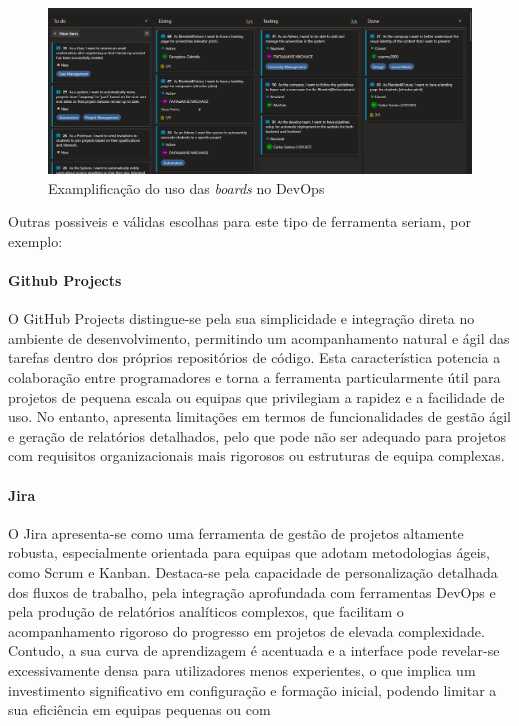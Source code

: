 \begin{figure}
    \includegraphics[width=\linewidth]{capitulos/cap1-introducao/imagens/ferramentas/devops-board.png}
    \caption{Examplificação do uso das \textit{boards} no DevOps}
    \label{fig:devops-boards}
\end{figure}

Outras possiveis e válidas escolhas para este tipo de ferramenta seriam, por exemplo:

\paragraph{Github Projects}

O GitHub Projects distingue-se pela sua simplicidade e integração direta no ambiente de desenvolvimento, permitindo um acompanhamento natural e ágil das tarefas dentro dos próprios repositórios de código. Esta característica potencia a colaboração entre programadores e torna a ferramenta particularmente útil para projetos de pequena escala ou equipas que privilegiam a rapidez e a facilidade de uso. No entanto, apresenta limitações em termos de funcionalidades de gestão ágil e geração de relatórios detalhados, pelo que pode não ser adequado para projetos com requisitos organizacionais mais rigorosos ou estruturas de equipa complexas.

\paragraph{Jira}

O Jira apresenta-se como uma ferramenta de gestão de projetos altamente robusta, especialmente orientada para equipas que adotam metodologias ágeis, como Scrum e Kanban. Destaca-se pela capacidade de personalização detalhada dos fluxos de trabalho, pela integração aprofundada com ferramentas DevOps e pela produção de relatórios analíticos complexos, que facilitam o acompanhamento rigoroso do progresso em projetos de elevada complexidade. Contudo, a sua curva de aprendizagem é acentuada e a interface pode revelar-se excessivamente densa para utilizadores menos experientes, o que implica um investimento significativo em configuração e formação inicial, podendo limitar a sua eficiência em equipas pequenas ou com 


